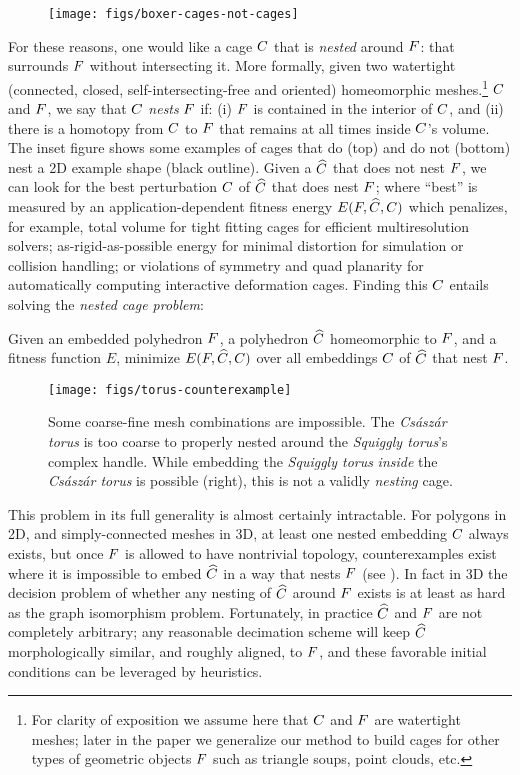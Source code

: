 \begin{wrapfigure}{r}{1.02in}
%
\centering
%
\texttt{[image: figs/boxer-cages-not-cages]}
%
\end{wrapfigure}
%
For these reasons, one would like a cage $C$ that is \emph{nested} around
$F$: that surrounds $F$ without intersecting it. More formally, given two
watertight (connected, closed, self-intersecting-free and oriented)
homeomorphic meshes.\footnote{For clarity of exposition we assume here that
$C$ and $F$ are watertight meshes; later in the paper we generalize our
method to build cages for other types of geometric objects $F$ such as
triangle soups, point clouds, etc.}
%
$C$ and $F$, we say that $C$ \emph{nests} $F$ if: 
%
(i) $F$ is contained in the interior of $C$, and 
%
(ii) there is a homotopy from $C$ to $F$ that remains at all times inside
$C$'s volume. 
%
The inset figure shows some examples of cages that do (top) and do not (bottom)
nest a 2D example shape (black outline). Given a $\widehat{C}$ that does not nest
$F$, we can look for the best perturbation $C$ of $\widehat{C}$ that does
nest $F$; where ``best'' is measured by an application-dependent fitness
energy $E(F, \widehat{C}, C)$ which penalizes, for example, total volume for
tight fitting cages for efficient multiresolution solvers; as-rigid-as-possible
energy for minimal distortion for simulation or collision handling; or
violations of symmetry and quad planarity for automatically computing
interactive deformation cages.  Finding this $C$ entails solving the
\emph{nested cage problem}:

Given an embedded polyhedron $F$, a polyhedron $\widehat{C}$ homeomorphic to $F$, and a
fitness function $E$, minimize $E(F, \widehat{C}, C)$ over all embeddings
$C$ of $\widehat{C}$ that nest $F$.


\begin{figure}
  \texttt{[image: figs/torus-counterexample]}
  \caption{Some coarse-fine mesh combinations are impossible. The
  \emph{Cs\'asz\'ar torus} is too coarse to properly nested around the
  \emph{Squiggly torus}'s complex handle. While embedding the \emph{Squiggly
  torus} \emph{inside} the \emph{Cs\'asz\'ar torus} is possible (right), this
  is not a validly \emph{nesting} cage.}
  \label{fig:torus-counterexample}
\end{figure}

This problem in its full generality is almost certainly intractable. For
polygons in 2D, and simply-connected meshes in 3D, at least one nested
embedding $C$ always exists, but once $F$ is allowed to have nontrivial
topology, counterexamples exist where it is impossible to embed $\widehat{C}$ in a way
that nests $F$ (see ). In fact in 3D the decision
problem of whether any nesting of $\widehat{C}$ around $F$ exists is at least as hard
as the graph isomorphism problem.
Fortunately, in practice $\widehat{C}$ and $F$ are not completely arbitrary; any
reasonable decimation scheme will keep $\widehat{C}$ morphologically similar, and
roughly aligned, to $F$, and these favorable initial conditions can be
leveraged by heuristics.

